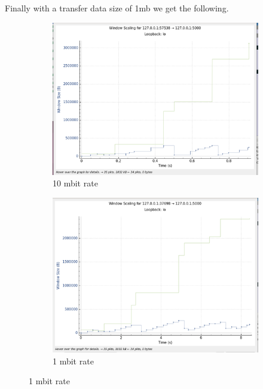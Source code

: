 \documentclass{report}
\begin{document}
Finally with a transfer data size of 1mb we get the following.
\begin{figure}[H]
    \centering
    \begin{subfigure}[b]{0.45\textwidth}
        \centering
        \includegraphics[width=\textwidth]{Pics/Cubic/r10mbit_s1m_ws}
        \caption{10 mbit rate }
    \end{subfigure}
    \hfill
    \begin{subfigure}[b]{0.45\textwidth}
        \centering
        \includegraphics[width=\textwidth]{Pics/Cubic/r1mbit_s1m_ws}
        \caption{1 mbit rate}
    \end{subfigure}
    \medskip


\end{figure}
\end{document}
